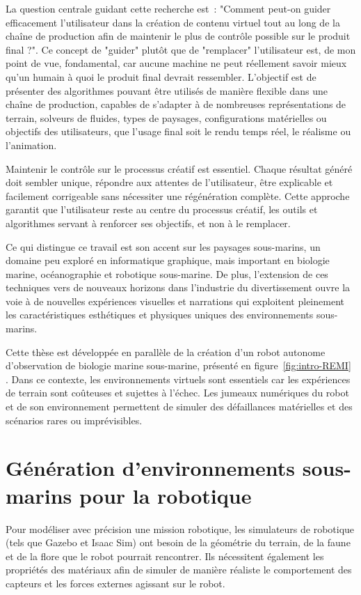 La question centrale guidant cette recherche est~: "Comment peut-on guider efficacement l'utilisateur dans la création de contenu virtuel tout au long de la chaîne de production afin de maintenir le plus de contrôle possible sur le produit final ?". Ce concept de "guider" plutôt que de "remplacer" l'utilisateur est, de mon point de vue, fondamental, car aucune machine ne peut réellement savoir mieux qu'un humain à quoi le produit final devrait ressembler. L'objectif est de présenter des algorithmes pouvant être utilisés de manière flexible dans une chaîne de production, capables de s'adapter à de nombreuses représentations de terrain, solveurs de fluides, types de paysages, configurations matérielles ou objectifs des utilisateurs, que l'usage final soit le rendu temps réel, le réalisme ou l'animation.

Maintenir le contrôle sur le processus créatif est essentiel. Chaque résultat généré doit sembler unique, répondre aux attentes de l'utilisateur, être explicable et facilement corrigeable sans nécessiter une régénération complète. Cette approche garantit que l'utilisateur reste au centre du processus créatif, les outils et algorithmes servant à renforcer ses objectifs, et non à le remplacer.

Ce qui distingue ce travail est son accent sur les paysages sous-marins, un domaine peu exploré en informatique graphique, mais important en biologie marine, océanographie et robotique sous-marine. De plus, l'extension de ces techniques vers de nouveaux horizons dans l'industrie du divertissement ouvre la voie à de nouvelles expériences visuelles et narrations qui exploitent pleinement les caractéristiques esthétiques et physiques uniques des environnements sous-marins.

Cette thèse est développée en parallèle de la création d'un robot autonome d'observation de biologie marine sous-marine, présenté en figure~\ref{fig:intro-REMI} \cite{Maslin2021}. Dans ce contexte, les environnements virtuels sont essentiels car les expériences de terrain sont coûteuses et sujettes à l'échec. Les jumeaux numériques du robot et de son environnement permettent de simuler des défaillances matérielles et des scénarios rares ou imprévisibles.

\section*{Génération d'environnements sous-marins pour la robotique}

    Pour modéliser avec précision une mission robotique, les simulateurs de robotique (tels que Gazebo et Isaac Sim) ont besoin de la géométrie du terrain, de la faune et de la flore que le robot pourrait rencontrer. Ils nécessitent également les propriétés des matériaux afin de simuler de manière réaliste le comportement des capteurs et les forces externes agissant sur le robot.

